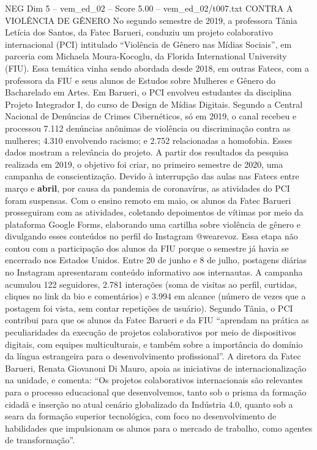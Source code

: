 \begin{textsample}{NEG Dim 5 – vem\_ed\_02 – Score 5.00 – vem\_ed\_02/t007.txt}  \label{ex:f5_neg_091}
CONTRA A VIOLÊNCIA DE GÊNERO No segundo semestre de 2019, a professora Tânia Letícia dos Santos, da Fatec Barueri, conduziu um projeto colaborativo internacional (PCI) intitulado “Violência de Gênero nas Mídias Sociais”, em parceria com Michaela Moura-Kocoglu, da Florida International University (FIU).
Essa temática vinha sendo abordada desde 2018, em outras Fatecs, com a professora da FIU e seus alunos de Estudos sobre Mulheres e Gênero do Bacharelado em Artes.
Em Barueri, o PCI envolveu estudantes da disciplina Projeto Integrador I, do curso de Design de Mídias Digitais.
Segundo a Central Nacional de Denúncias de Crimes Cibernéticos, só em 2019, o canal recebeu e processou 7.112 denúncias anônimas de violência ou discriminação contra as mulheres; 4.310 envolvendo racismo; e 2.752 relacionadas a homofobia.
Esses dados mostram a relevância do projeto.
A partir dos resultados da pesquisa realizada em 2019, o objetivo foi criar, no primeiro semestre de 2020, uma campanha de conscientização.
Devido à interrupção das aulas nas Fatecs entre março e \textbf{abril}, por causa da pandemia de coronavírus, as atividades do PCI foram suspensas.
Com o ensino remoto em maio, os alunos da Fatec Barueri prosseguiram com as atividades, coletando depoimentos de vítimas por meio da plataforma Google Forms, elaborando uma cartilha sobre violência de gênero e divulgando esses conteúdos no perfil do Instagram @wearevoz.
Essa etapa não contou com a participação dos alunos da FIU porque o semestre já havia se encerrado nos Estados Unidos.
Entre 20 de junho e 8 de julho, postagens diárias no Instagram apresentaram conteúdo informativo aos internautas.
A campanha acumulou 122 seguidores, 2.781 interações (soma de visitas ao perfil, curtidas, cliques no link da bio e comentários) e 3.994 em alcance (número de vezes que a postagem foi vista, sem contar repetições de usuário).
Segundo Tânia, o PCI contribui para que os alunos da Fatec Barueri e da FIU “aprendam na prática as peculiaridades da execução de projetos colaborativos por meio de dispositivos digitais, com equipes multiculturais, e também sobre a importância do domínio da língua estrangeira para o desenvolvimento profissional”.
A diretora da Fatec Barueri, Renata Giovanoni Di Mauro, apoia as iniciativas de internacionalização na unidade, e comenta: “Os projetos colaborativos internacionais são relevantes para o processo educacional que desenvolvemos, tanto sob o prisma da formação cidadã e inserção no atual cenário globalizado da Indústria 4.0, quanto sob a seara da formação superior tecnológica, com foco no desenvolvimento de habilidades que impulsionam os alunos para o mercado de trabalho, como agentes de transformação”.

\end{textsample}
